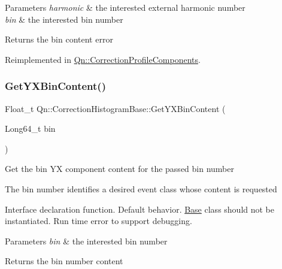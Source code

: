 \begin{DoxyParams}{Parameters}
{\em harmonic} & the interested external harmonic number \\
\hline
{\em bin} & the interested bin number \\
\hline
\end{DoxyParams}
\begin{DoxyReturn}{Returns}
the bin content error 
\end{DoxyReturn}


Reimplemented in \mbox{\hyperlink{classQn_1_1CorrectionProfileComponents_a13d0f6f98ec1bf3fc5a3934c09d48ba9}{Qn\+::\+Correction\+Profile\+Components}}.

\mbox{\label{classQn_1_1CorrectionHistogramBase_a2bc9c26889a5ff0479f5638e2e253174}} 
\subsubsection{\texorpdfstring{Get\+Y\+X\+Bin\+Content()}{GetYXBinContent()}\hspace{0.1cm}{\footnotesize\ttfamily [1/2]}}
{\footnotesize\ttfamily Float\+\_\+t Qn\+::\+Correction\+Histogram\+Base\+::\+Get\+Y\+X\+Bin\+Content (\begin{DoxyParamCaption}\item[{Long64\+\_\+t}]{bin }\end{DoxyParamCaption})\hspace{0.3cm}{\ttfamily [virtual]}}

Get the bin YX component content for the passed bin number

The bin number identifies a desired event class whose content is requested

Interface declaration function. Default behavior. \mbox{\hyperlink{classBase}{Base}} class should not be instantiated. Run time error to support debugging.


\begin{DoxyParams}{Parameters}
{\em bin} & the interested bin number \\
\hline
\end{DoxyParams}
\begin{DoxyReturn}{Returns}
the bin number content 
\end{DoxyReturn}


